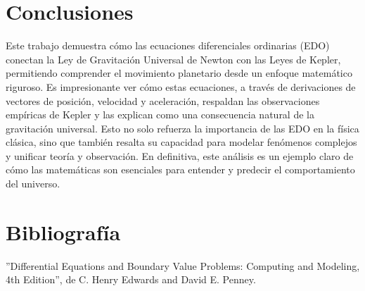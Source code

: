 \documentclass{article}
\begin{document}
	\clearpage
	
	\section{Conclusiones}
	Este trabajo demuestra cómo las ecuaciones diferenciales ordinarias (EDO) conectan la Ley de Gravitación Universal de Newton con las Leyes de Kepler, permitiendo comprender el movimiento planetario desde un enfoque matemático riguroso. Es impresionante ver cómo estas ecuaciones, a través de derivaciones de vectores de posición, velocidad y aceleración, respaldan las observaciones empíricas de Kepler y las explican como una consecuencia natural de la gravitación universal. Esto no solo refuerza la importancia de las EDO en la física clásica, sino que también resalta su capacidad para modelar fenómenos complejos y unificar teoría y observación. En definitiva, este análisis es un ejemplo claro de cómo las matemáticas son esenciales para entender y predecir el comportamiento del universo.\\
	
	\section{Bibliografía}
	
	”Differential Equations and Boundary Value Problems:
	Computing and Modeling, 4th Edition”, de C. Henry Edwards and David E. Penney.
	 
\end{document}
